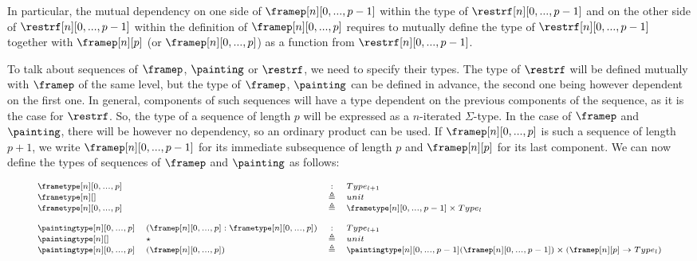 \documentclass{msc}
\newcommand{\defeq}{\ensuremath{\triangleq}}
\begin{document}
In particular, the mutual dependency on one side of $\framep[n][0,...,p-1]$ within the type of $\restrf[n][0,...,p-1]$ and on the other side of $\restrf[n][0,...,p-1]$ within the definition of $\framep[n][0,...,p]$ requires to mutually define the type of $\restrf[n][0,...,p-1]$ together with $\framep[n][p]$ (or $\framep[n][0,...,p]$) as a function from $\restrf[n][0,...,p-1]$.

To talk about sequences of $\framep$, $\painting$ or $\restrf$, we need to specify their types. The type of $\restrf$ will be defined mutually with $\framep$ of the same level, but the type of $\framep$, $\painting$ can be defined in advance, the second one being however dependent on the first one. In general, components of such sequences will have a type dependent on the previous components of the sequence, as it is the case for $\restrf$. So, the type of a sequence of length $p$ will be expressed as a $n$-iterated $\Sigma$-type. In the case of $\framep$ and $\painting$, there will be however no dependency, so an ordinary product can be used. If $\framep[n][0,...,p]$ is such a sequence of length $p+1$, we write $\framep[n][0,...,p-1]$ for its immediate subsequence of length $p$ and $\framep[n][p]$ for its last component. We can now define the types of sequences of $\framep$ and $\painting$ as follows:

\begin{equation*}
  \fontsize{7.2}{9}\selectfont
  \begin{array}{llcl}
    \frametype[n][0,...,p]    &                                              & :      & Type_{l+1}                                                                                   \\
    \frametype[n][]           &                                              & \defeq & unit                                                                                         \\
    \frametype[n][0,...,p]    &                                              & \defeq & \frametype[n][0,...,p-1] \times Type_l                                                       \\
    \\
    \paintingtype[n][0,...,p] & (\framep[n][0,...,p]:\frametype[n][0,...,p]) & :      & Type_{l+1}                                                                                   \\
    \paintingtype[n][]        & \star                                        & \defeq & unit                                                                                         \\
    \paintingtype[n][0,...,p] & (\framep[n][0,...,p])                        & \defeq & \paintingtype[n][0,...,p-1](\framep[n][0,...,p-1]) \times (\framep[n][p] \rightarrow Type_l) \\
  \end{array}
\end{equation*}
\end{document}
